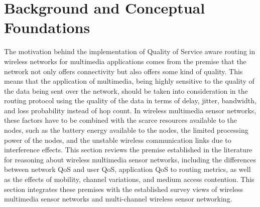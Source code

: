 \documentclass[12pt]{article}
\begin{document}
	\section{Background and Conceptual Foundations}
	The motivation behind \cite{Chiwariro2022789,Sen2010CrossLayerSurvey}the implementation of Quality of Service aware routing in wireless networks for multimedia applications comes from the premise that the network not only offers connectivity but also offers some kind of quality. This means that the application of multimedia, being highly sensitive to the quality of the data being sent over the network, should be taken into consideration in the routing protocol using the quality of the data in terms of delay, jitter, bandwidth, and loss probability instead of hop count. In wireless multimedia sensor networks, these factors have to be combined with the scarce resources available to the nodes, such as the battery energy available to the nodes, the limited processing power of the nodes, and the unstable wireless communication links due to interference effects. This section reviews the premise established in the literature for reasoning about wireless multimedia sensor networks, including the differences between network QoS and user QoS, application QoS to routing metrics, as well as the effects of mobility, channel variations, and medium access contention. This section integrates these premises with the established survey views of wireless multimedia sensor networks and multi-channel wireless sensor networking.
\end{document}
